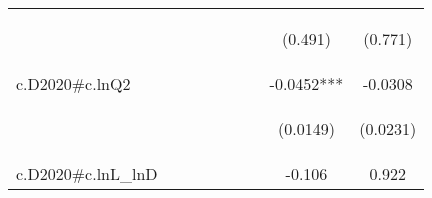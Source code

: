 \documentclass[]{article}
\begin{document}
\begin{center}
\begin{tabular}{lcccccccc}
\vspace{4pt} & \begin{footnotesize}\end{footnotesize} & \begin{footnotesize}\end{footnotesize} & \begin{footnotesize}\end{footnotesize} & \begin{footnotesize}\end{footnotesize} & \begin{footnotesize}\end{footnotesize} & \begin{footnotesize}\end{footnotesize} & \begin{footnotesize}(0.491)\end{footnotesize} & \begin{footnotesize}(0.771)\end{footnotesize} \\
c.D2020\#c.lnQ2 &  &  &  &  &  &  & -0.0452*** & -0.0308 \\
\vspace{4pt} & \begin{footnotesize}\end{footnotesize} & \begin{footnotesize}\end{footnotesize} & \begin{footnotesize}\end{footnotesize} & \begin{footnotesize}\end{footnotesize} & \begin{footnotesize}\end{footnotesize} & \begin{footnotesize}\end{footnotesize} & \begin{footnotesize}(0.0149)\end{footnotesize} & \begin{footnotesize}(0.0231)\end{footnotesize} \\
c.D2020\#c.lnL\_lnD &  &  &  &  &  &  & -0.106 & 0.922 \\

\end{tabular}
\end{center}
\end{document}
